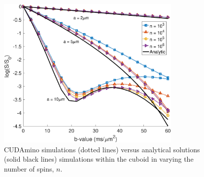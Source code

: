 




\begin{figure}
  \centering
  \includegraphics[width=0.8\textwidth]{figures/cudamino/new/cuboid_all_cudamino_nspin.eps}
  \caption{CUDAmino simulations (dotted lines) versus analytical solutions (solid black lines) simulations within the cuboid in  varying the number of spins, $n$.}
  \label{fig:cuboid_cudamino_nspin}
\end{figure}




